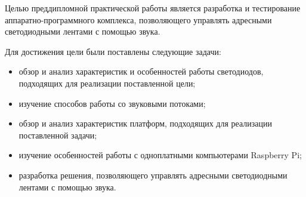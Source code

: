 Целью преддипломной практической работы является разработка и тестирование аппаратно-программного комплекса, позволяющего управлять адресными светодиодными лентами с помощью звука.

Для достижения цели были поставлены следующие задачи:

\begin{itemize}
  \item обзор и анализ характеристик и особенностей работы светодиодов, подходящих для реализации поставленной цели;
  \item изучение способов работы со звуковыми потоками;
  \item обзор и анализ характеристик платформ, подходящих для реализации поставленной задачи;
  \item изучение особенностей работы с одноплатными компьютерами Raspberry Pi;
  \item разработка решения, позволяющего управлять адресными светодиодными лентами с помощью звука.
\end{itemize}